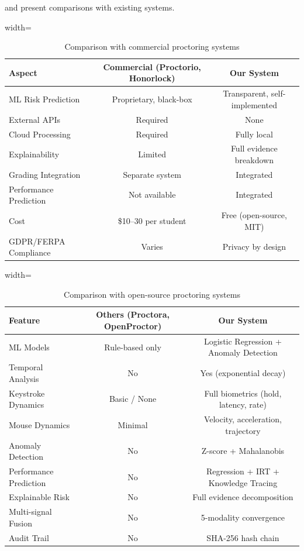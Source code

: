 \documentclass{article}
\begin{document}
 and  present comparisons with existing systems.

\begin{table}[H]
\centering
\caption{Comparison with commercial proctoring systems}
\label{tab:comparison_commercial}
\begin{adjustbox}{width=\textwidth}
\begin{tabular}{l c c}
\toprule
\textbf{Aspect} & \textbf{Commercial (Proctorio, Honorlock)} & \textbf{Our System} \\
\midrule
ML Risk Prediction & Proprietary, black-box & Transparent, self-implemented \\
External APIs & Required & None \\
Cloud Processing & Required & Fully local \\
Explainability & Limited & Full evidence breakdown \\
Grading Integration & Separate system & Integrated \\
Performance Prediction & Not available & Integrated \\
Cost & \$10--30 per student & Free (open-source, MIT) \\
GDPR/FERPA Compliance & Varies & Privacy by design \\
\bottomrule
\end{tabular}
\end{adjustbox}
\end{table}

\begin{table}[H]
\centering
\caption{Comparison with open-source proctoring systems}
\label{tab:comparison_opensource}
\begin{adjustbox}{width=\textwidth}
\begin{tabular}{l c c}
\toprule
\textbf{Feature} & \textbf{Others (Proctora, OpenProctor)} & \textbf{Our System} \\
\midrule
ML Models & Rule-based only & Logistic Regression + Anomaly Detection \\
Temporal Analysis & No & Yes (exponential decay) \\
Keystroke Dynamics & Basic / None & Full biometrics (hold, latency, rate) \\
Mouse Dynamics & Minimal & Velocity, acceleration, trajectory \\
Anomaly Detection & No & Z-score + Mahalanobis \\
Performance Prediction & No & Regression + IRT + Knowledge Tracing \\
Explainable Risk & No & Full evidence decomposition \\
Multi-signal Fusion & No & 5-modality convergence \\
Audit Trail & No & SHA-256 hash chain \\
\bottomrule
\end{tabular}
\end{adjustbox}
\end{table}
\end{document}
